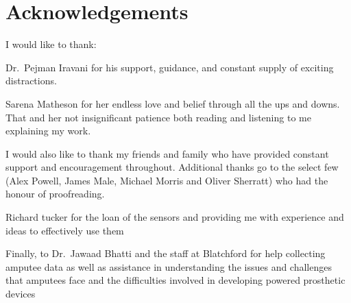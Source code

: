 \chapter*{Acknowledgements}

I would like to thank:

Dr.~Pejman Iravani for his support, guidance, and constant supply of exciting distractions.

Sarena Matheson for her endless love and belief through all the ups and downs. That and her not insignificant patience both reading and listening to me explaining my work.

I would also like to thank my friends and family who have provided constant support and encouragement throughout. Additional thanks go to the select few (Alex Powell, James Male, Michael Morris and Oliver Sherratt) who had the honour of proofreading.

Richard tucker for the loan of the sensors and providing me with experience and ideas to effectively use them 

Finally, to Dr.~Jawaad Bhatti and the staff at Blatchford for help collecting amputee data as well as assistance in understanding the issues and challenges that amputees face and the difficulties involved in developing powered prosthetic devices